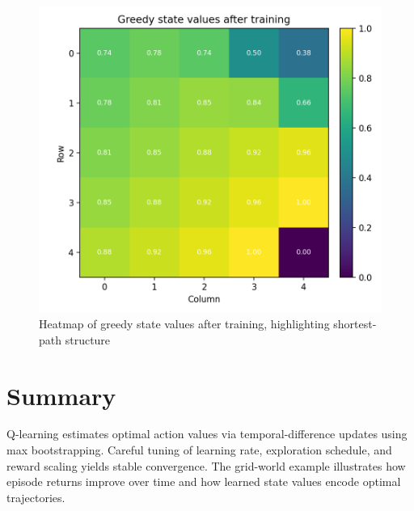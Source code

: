 ﻿\documentclass[12pt]{article}
\begin{document}
\begin{figure}[H]
  \centering
  \includegraphics[width=0.82\linewidth]{q_learning_state_values.png}
  \caption{Heatmap of greedy state values after training, highlighting shortest-path structure}
  \label{fig:q_learning_state_values}
\end{figure}

\FloatBarrier
\section{Summary}
Q-learning estimates optimal action values via temporal-difference updates using max bootstrapping. Careful tuning of learning rate, exploration schedule, and reward scaling yields stable convergence. The grid-world example illustrates how episode returns improve over time and how learned state values encode optimal trajectories.
\end{document}
